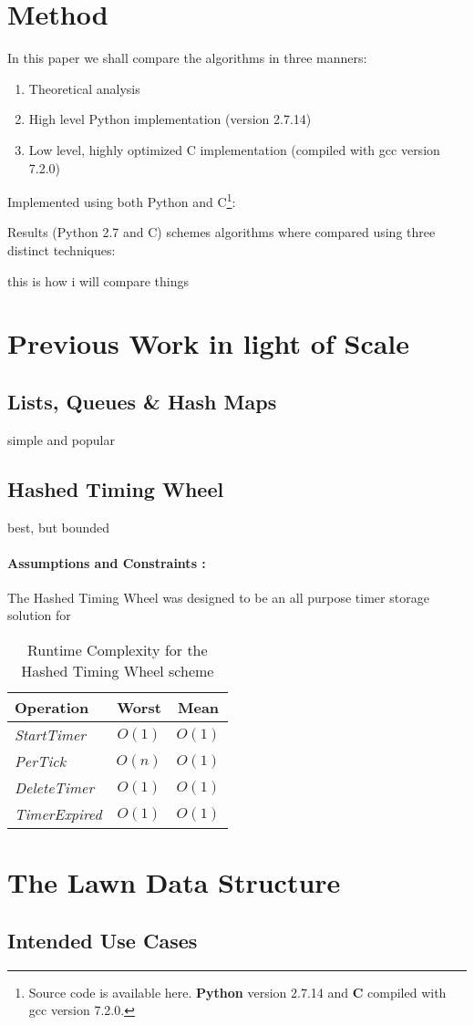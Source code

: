\documentclass[twocolumn,a4paper]{article}
\newcommand{\advcomplexity}[9]{
\begin{table}[h!]
	\begin{center}
		\begin{tabular}{l|c|c}
			\textbf{Operation} & \textbf{Worst} & \textbf{Mean} \\
			\hline
			\textit{StartTimer} & $O(#1)$ & $O(#2)$ \\
			\textit{PerTick} & $O(#3)$ & $O(#4)$ \\
			\textit{DeleteTimer} & $O(#5)$ & $O(#6)$ \\
			\textit{TimerExpired} & $O(#7)$ & $O(#8)$ \\
		\end{tabular}
		\caption{Runtime Complexity for #9 scheme}
		\label{tab:table1}
	\end{center}
\end{table}
}
\begin{document}

\section{Method}
In this paper we shall compare the algorithms in three manners:
\begin{enumerate}
	\item Theoretical analysis 
	\item High level Python implementation (version 2.7.14)
	\item Low level, highly optimized C implementation (compiled with gcc version 7.2.0)
\end{enumerate}
 Implemented using both Python and C\footnote{Source code is available here\cite{GH}. \textbf{Python} version 2.7.14 and \textbf{C} compiled with gcc version 7.2.0. }:

Results 
 (Python 2.7 and C) schemes algorithms where compared using three distinct techniques:
 
this is how i will compare things

\section{Previous Work in light of Scale}

\subsection{Lists, Queues \& Hash Maps}
simple and popular


\subsection{Hashed Timing Wheel}
best, but bounded

\paragraph{Assumptions and Constraints :}
The Hashed Timing Wheel was designed to be an all purpose timer storage solution for  


\advcomplexity{1}{1}{n}{1}{1}{1}{1}{1}{the Hashed Timing Wheel}


\section{The Lawn Data Structure}
 
\subsection{Intended Use Cases}
\end{document}

